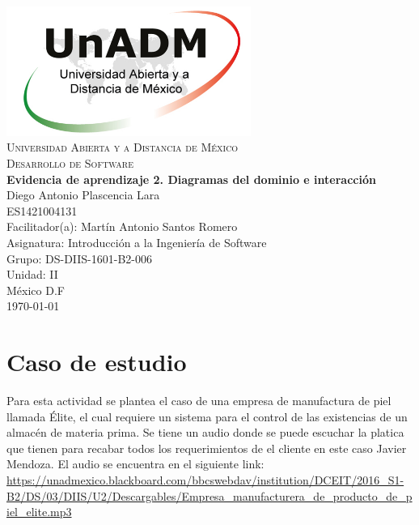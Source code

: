\documentclass[spanish,12pt,letterpapper]{article}
\begin{document}
	\begin{titlepage}
		\begin{center}
			\includegraphics[width=0.6\textwidth]{../logoUnADM}~\\[1cm] 
			\textsc{Universidad Abierta y a Distancia de México}\\[0.8cm]
			\textsc{Desarrollo de Software}\\[1.8cm]
			
			\textbf{ \Large Evidencia de aprendizaje 2. Diagramas del dominio e interacción}\\[3cm]
			
			Diego Antonio Plascencia Lara\\ ES1421004131 \\[0.4cm]
			Facilitador(a): Martín Antonio Santos Romero\\
			Asignatura: Introducción a la Ingeniería de Software\\
			Grupo: DS-DIIS-1601-B2-006 \\
			Unidad: II \\
			
			\vfill México D.F\\{\today}
			
		\end{center}
	\end{titlepage}
	
	\section{Caso de estudio}
	Para esta actividad se plantea el caso de una empresa de manufactura de piel llamada Élite, el cual requiere un sistema para el control de las existencias de un almacén de materia prima. Se tiene un audio donde se puede escuchar la platica que tienen para recabar todos los requerimientos de el cliente en este caso Javier Mendoza. El audio se encuentra en el siguiente link:\\
	\url{https://unadmexico.blackboard.com/bbcswebdav/institution/DCEIT/2016_S1-B2/DS/03/DIIS/U2/Descargables/Empresa_manufacturera_de_producto_de_piel_elite.mp3}
	
\end{document}
